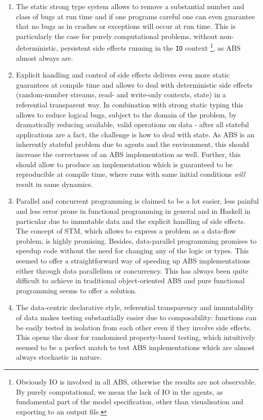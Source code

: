 \begin{enumerate}
	\item The static strong type system allows to remove a substantial number and class of bugs at run time and if one programs careful one can even guarantee that no bugs as in crashes or exceptions will occur at run time. This is particularly the case for purely computational problems, without non-deterministic, persistent side effects running in the \texttt{IO} context \footnote{Obviously IO is involved in all ABS, otherwise the results are not observable. By purely computational, we mean the lack of IO in the agents, as fundamental part of the model specification, other than visualisation and exporting to an output file.}, as ABS almost always are. 
	
	\item Explicit handling and control of side effects delivers even more static guarantees at compile time and allows to deal with deterministic side effects (random-number streams, read- and write-only contexts, state) in a referential transparent way. In combination with strong static typing this allows to reduce logical bugs, subject to the domain of the problem, by dramatically reducing available, valid operations on data - after all stateful applications are a fact, the challenge is how to deal with state. As ABS is an inherently stateful problem due to agents and the environment, this should increase the correctness of an ABS implementation as well. Further, this should allow to produce an implementation which is guaranteed to be reproducible at compile time, where runs with same initial conditions \textit{will} result in same dynamics.
	
	\item Parallel and concurrent programming is claimed to be a lot easier, less painful and less error prone in functional programming in general and in Haskell in particular due to immutable data and the explicit handling of side effects. The concept of STM, which allows to express a problem as a data-flow problem, is highly promising. Besides, data-parallel programming promises to speedup code without the need for changing any of the logic or types. This seemed to offer a straightforward way of speeding up ABS implementations either through data parallelism or concurrency. This has always been quite difficult to achieve in traditional object-oriented ABS and pure functional programming seems to offer a solution.
	
	\item The data-centric declarative style, referential transparency and immutability of data makes testing substantially easier due to composability: functions can be easily tested in isolation from each other even if they involve side effects. This opens the door for randomised property-based testing, which intuitively seemed to be a perfect match to test ABS implementations which are almost always stochastic in nature.
\end{enumerate}

